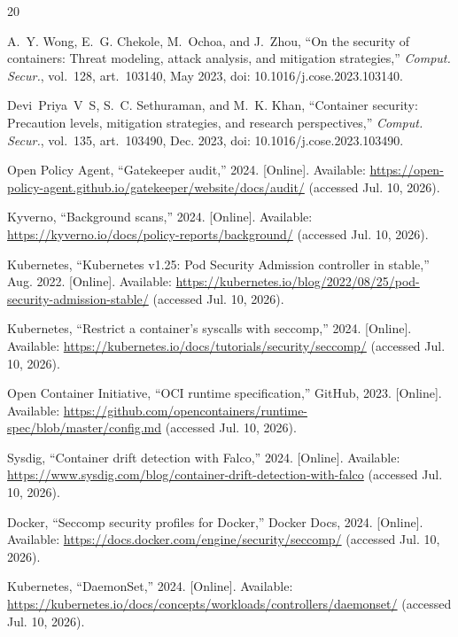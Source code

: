 \documentclass[conference]{IEEEtran}
\begin{document}
\begin{thebibliography}{20}

A.~Y. Wong, E.~G. Chekole, M.~Ochoa, and J.~Zhou, ``On the security of containers: Threat modeling, attack analysis, and mitigation strategies,'' \emph{Comput. Secur.}, vol.~128, art.~103140, May 2023, doi: 10.1016/j.cose.2023.103140.

Devi~Priya~V~S, S.~C. Sethuraman, and M.~K. Khan, ``Container security: Precaution levels, mitigation strategies, and research perspectives,'' \emph{Comput. Secur.}, vol.~135, art.~103490, Dec. 2023, doi: 10.1016/j.cose.2023.103490.

Open Policy Agent, ``Gatekeeper audit,'' 2024. [Online]. Available: \url{https://open-policy-agent.github.io/gatekeeper/website/docs/audit/} (accessed Jul. 10, 2026).

Kyverno, ``Background scans,'' 2024. [Online]. Available: \url{https://kyverno.io/docs/policy-reports/background/} (accessed Jul. 10, 2026).

Kubernetes, ``Kubernetes v1.25: Pod Security Admission controller in stable,'' Aug. 2022. [Online]. Available: \url{https://kubernetes.io/blog/2022/08/25/pod-security-admission-stable/} (accessed Jul. 10, 2026).

Kubernetes, ``Restrict a container's syscalls with seccomp,'' 2024. [Online]. Available: \url{https://kubernetes.io/docs/tutorials/security/seccomp/} (accessed Jul. 10, 2026).

Open Container Initiative, ``OCI runtime specification,'' GitHub, 2023. [Online]. Available: \url{https://github.com/opencontainers/runtime-spec/blob/master/config.md} (accessed Jul. 10, 2026).

Sysdig, ``Container drift detection with Falco,'' 2024. [Online]. Available: \url{https://www.sysdig.com/blog/container-drift-detection-with-falco} (accessed Jul. 10, 2026).

Docker, ``Seccomp security profiles for Docker,'' Docker Docs, 2024. [Online]. Available: \url{https://docs.docker.com/engine/security/seccomp/} (accessed Jul. 10, 2026).

Kubernetes, ``DaemonSet,'' 2024. [Online]. Available: \url{https://kubernetes.io/docs/concepts/workloads/controllers/daemonset/} (accessed Jul. 10, 2026).


\end{thebibliography}
\end{document}
